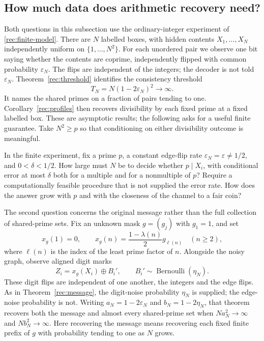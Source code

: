 \subsection{How much data does arithmetic recovery need?}

Both questions in this subsection use the ordinary-integer experiment
of \eqref{rec:finite-model}.  There are $N$ labelled boxes, with hidden
contents $X_1,\ldots,X_N$ independently uniform on
$\{1,\ldots,N^2\}$.  For each unordered pair we observe one bit saying
whether the contents are coprime, independently flipped with common
probability $\varepsilon_N$.  The flips are independent of the
integers; the decoder is not told $\varepsilon_N$.
Theorem~\ref{rec:threshold} identifies the consistency threshold
\[
 T_N=N(1-2\varepsilon_N)^2\longrightarrow\infty.
\]
It names the shared primes on a fraction of pairs tending to one.
Corollary~\ref{rec:profiles} then recovers divisibility by each fixed
prime at a fixed labelled box.  These are asymptotic results; the
following asks for a useful finite guarantee.  Take $N^2\ge p$ so
that conditioning on either divisibility outcome is meaningful.

\begin{question}\label{rec:prime-sample-question}
In the finite experiment, fix a prime $p$, a constant edge-flip rate
$\varepsilon_N=\varepsilon\ne1/2$, and
$0<\delta<1/2$. How large must $N$ be to decide whether $p\mid X_i$,
with conditional error at most $\delta$ both for a multiple and for a
nonmultiple of $p$? Require a computationally feasible procedure that
is not supplied the error rate. How does the answer grow with $p$
and with the closeness of the channel to a fair coin?
\end{question}

The second question concerns the original message rather than the
full collection of shared-prime sets.  Fix an unknown mask
$g=(g_j)$ with $g_1=1$, and set
\[
 x_g(1)=0,\qquad
 x_g(n)=\frac{1-\lambda(n)}2g_{\ell(n)}\quad(n\ge2),
\]
where $\ell(n)$ is the index of the least prime factor of $n$.
Alongside the noisy graph, observe aligned digit marks
\[
 Z_i=x_g(X_i)\mathbin{\oplus}B_i',
 \qquad B_i'\sim\operatorname{Bernoulli}(\eta_N).
\]
These digit flips are independent of one another, the integers and
the edge flips.  As in Theorem~\ref{rec:message}, the digit-noise
probability $\eta_N$ is supplied; the edge-noise probability is not.
Writing $a_N=1-2\varepsilon_N$ and $b_N=1-2\eta_N$, that theorem
recovers both the message and almost every shared-prime set when
$Na_N^2\to\infty$ and $Nb_N^2\to\infty$.
Here recovering the message means recovering each fixed finite prefix
of $g$ with probability tending to one as $N$ grows.

